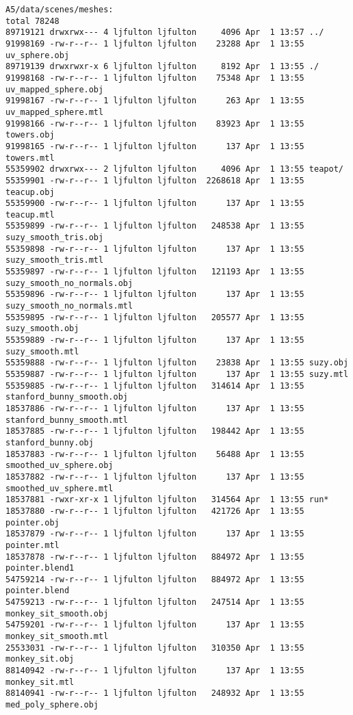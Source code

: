 \documentclass[12pt]{article}
\begin{document}
\begin{verbatim}
A5/data/scenes/meshes:
total 78248
89719121 drwxrwx--- 4 ljfulton ljfulton     4096 Apr  1 13:57 ../
91998169 -rw-r--r-- 1 ljfulton ljfulton    23288 Apr  1 13:55 uv_sphere.obj
89719139 drwxrwxr-x 6 ljfulton ljfulton     8192 Apr  1 13:55 ./
91998168 -rw-r--r-- 1 ljfulton ljfulton    75348 Apr  1 13:55 uv_mapped_sphere.obj
91998167 -rw-r--r-- 1 ljfulton ljfulton      263 Apr  1 13:55 uv_mapped_sphere.mtl
91998166 -rw-r--r-- 1 ljfulton ljfulton    83923 Apr  1 13:55 towers.obj
91998165 -rw-r--r-- 1 ljfulton ljfulton      137 Apr  1 13:55 towers.mtl
55359902 drwxrwx--- 2 ljfulton ljfulton     4096 Apr  1 13:55 teapot/
55359901 -rw-r--r-- 1 ljfulton ljfulton  2268618 Apr  1 13:55 teacup.obj
55359900 -rw-r--r-- 1 ljfulton ljfulton      137 Apr  1 13:55 teacup.mtl
55359899 -rw-r--r-- 1 ljfulton ljfulton   248538 Apr  1 13:55 suzy_smooth_tris.obj
55359898 -rw-r--r-- 1 ljfulton ljfulton      137 Apr  1 13:55 suzy_smooth_tris.mtl
55359897 -rw-r--r-- 1 ljfulton ljfulton   121193 Apr  1 13:55 suzy_smooth_no_normals.obj
55359896 -rw-r--r-- 1 ljfulton ljfulton      137 Apr  1 13:55 suzy_smooth_no_normals.mtl
55359895 -rw-r--r-- 1 ljfulton ljfulton   205577 Apr  1 13:55 suzy_smooth.obj
55359889 -rw-r--r-- 1 ljfulton ljfulton      137 Apr  1 13:55 suzy_smooth.mtl
55359888 -rw-r--r-- 1 ljfulton ljfulton    23838 Apr  1 13:55 suzy.obj
55359887 -rw-r--r-- 1 ljfulton ljfulton      137 Apr  1 13:55 suzy.mtl
55359885 -rw-r--r-- 1 ljfulton ljfulton   314614 Apr  1 13:55 stanford_bunny_smooth.obj
18537886 -rw-r--r-- 1 ljfulton ljfulton      137 Apr  1 13:55 stanford_bunny_smooth.mtl
18537885 -rw-r--r-- 1 ljfulton ljfulton   198442 Apr  1 13:55 stanford_bunny.obj
18537883 -rw-r--r-- 1 ljfulton ljfulton    56488 Apr  1 13:55 smoothed_uv_sphere.obj
18537882 -rw-r--r-- 1 ljfulton ljfulton      137 Apr  1 13:55 smoothed_uv_sphere.mtl
18537881 -rwxr-xr-x 1 ljfulton ljfulton   314564 Apr  1 13:55 run*
18537880 -rw-r--r-- 1 ljfulton ljfulton   421726 Apr  1 13:55 pointer.obj
18537879 -rw-r--r-- 1 ljfulton ljfulton      137 Apr  1 13:55 pointer.mtl
18537878 -rw-r--r-- 1 ljfulton ljfulton   884972 Apr  1 13:55 pointer.blend1
54759214 -rw-r--r-- 1 ljfulton ljfulton   884972 Apr  1 13:55 pointer.blend
54759213 -rw-r--r-- 1 ljfulton ljfulton   247514 Apr  1 13:55 monkey_sit_smooth.obj
54759201 -rw-r--r-- 1 ljfulton ljfulton      137 Apr  1 13:55 monkey_sit_smooth.mtl
25533031 -rw-r--r-- 1 ljfulton ljfulton   310350 Apr  1 13:55 monkey_sit.obj
88140942 -rw-r--r-- 1 ljfulton ljfulton      137 Apr  1 13:55 monkey_sit.mtl
88140941 -rw-r--r-- 1 ljfulton ljfulton   248932 Apr  1 13:55 med_poly_sphere.obj


\end{verbatim}
\end{document}
